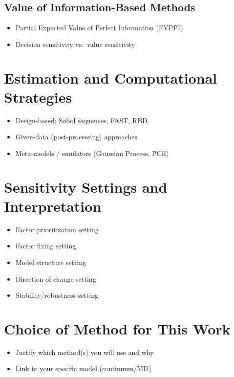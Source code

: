 \documentclass[../proposal]{subfiles}
\begin{document}
  \subsection{Value of Information-Based Methods}
  \begin{itemize}
    \item Partial Expected Value of Perfect Information (EVPPI)
    \item Decision sensitivity vs.\ value sensitivity
  \end{itemize}

\section{Estimation and Computational Strategies}
\begin{itemize}
  \item Design-based: Sobol sequences, FAST, RBD
  \item Given-data (post-processing) approaches
  \item Meta-models / emulators (Gaussian Process, PCE)
\end{itemize}

\section{Sensitivity Settings and Interpretation}
\begin{itemize}
  \item Factor prioritization setting
  \item Factor fixing setting
  \item Model structure setting
  \item Direction of change setting
  \item Stability/robustness setting
\end{itemize}

\section{Choice of Method for This Work}
\begin{itemize}
  \item Justify which method(s) you will use and why
  \item Link to your specific model (continuum/MD)
\end{itemize}
\end{document}
